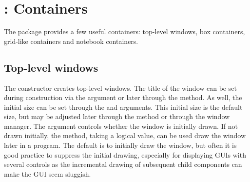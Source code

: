 \chapter{: Containers}
\label{sec:gWidgets-Containers}



The  package provides a few useful containers: top-level
windows, box containers, grid-like containers and notebook containers.

\section{Top-level windows}
\label{sec:gWidgets-top-level-windows}

The  constructor creates top-level windows. The
title of the window can be set during construction via the
 argument or later through the
 method. As well, the initial size can be set
through the  and 
arguments. This initial size is the default size, but may be adjusted
later through the  method or through the window
manager. The  argument controls whether the
window is initially drawn. If not drawn initially, the
 method, taking a logical value, can be used draw the window
later in a program.  The default is to initially draw the window, but often it is good practice to suppress the initial drawing, especially for displaying GUIs with several controls as the
incremental  drawing of subsequent child components can make the
GUI seem sluggish.


